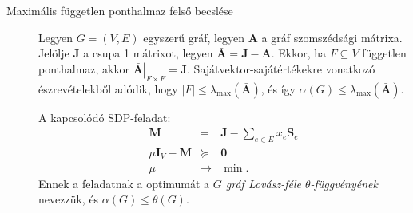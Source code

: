 \documentclass[%
	DIV=15,appendixprefix]{scrreprt}
\theoremstyle{definition}
\theoremstyle{remark}
\DeclareMathOperator{\T}{T}
\DeclareMathOperator{\diag}{diag}
\begin{document}
\begin{description}
	\item[Maximális független ponthalmaz felső becslése]  Legyen $ G = \left( V,{} E \right) $
		egyszerű gráf, legyen $ \mathbf{ A } $ a gráf szomszédsági mátrixa. Jelölje $ \mathbf{ J } $
		a csupa 1 mátrixot, legyen $ \bar{ \mathbf{ A } } = \mathbf{ J } - \mathbf{ A } $. Ekkor, ha
		$ F \subseteq V $ független ponthalmaz, akkor $ \left. \bar{ \mathbf{ A } }
		\right|_{ F \times F } = \mathbf{ J } $. Sajátvektor-sajátértékekre vonatkozó
		észrevételekből adódik, hogy $ \left| F \right| \le \lambda_{ \max } \left(
		\bar{ \mathbf{ A } } \right) $, és így $ \alpha \left( G \right)  \le \lambda_{ \max }
		\left( \bar{ \mathbf{ A } } \right) $.

		A kapcsolódó SDP-feladat:
%
		\begin{equation*}
	 		\begin{array}{rcl}
				\mathbf{ M } 									&		=		& \mathbf{ J } -
					\sum_{ e \in E } x_{ e } \mathbf{ S }_{ e }\\
				\mu \mathbf{ I }_{ V } - \mathbf{ M }			&		\succeq	& \mathbf{ 0 }\\
				\hline
				\mu	&	\rightarrow	&	\min.
			\end{array}
		\end{equation*}
		Ennek a feladatnak a optimumát a \emph{$ G $ gráf Lovász-féle $ \theta $-függvényének}
		nevezzük, és $ \alpha \left( G \right) \le \theta \left( G \right) $.


\end{description}
\end{document}
